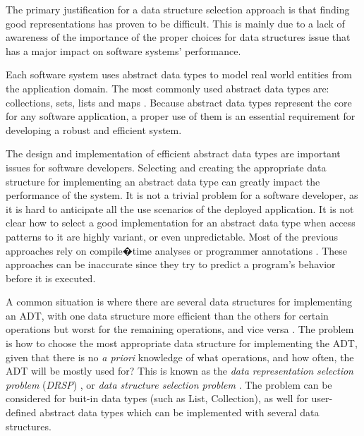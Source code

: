 
The primary justification for a data structure selection
approach is that finding good representations
has proven to be difficult. This is mainly due to a lack of awareness of the importance
of the proper choices for data structures issue that has a major impact on software systems' performance.

Each software system uses abstract data types \cite{adt} to model real world entities from the application domain. The most commonly used abstract data types are: collections, sets, lists and maps \cite{Cormen09Introduction}. Because abstract data types represent the core for any software application, a proper use of them is an essential requirement for developing a robust and efficient system. 

The design and implementation of efficient abstract data types are important issues for software developers. Selecting and creating the appropriate data structure for implementing an abstract data type can greatly impact the performance of the system. It is not a trivial problem for a software developer, as it is hard to anticipate all the use scenarios of the deployed application. It is not clear how to select a good implementation
for an abstract data type when access patterns to it are
highly variant, or even unpredictable. Most of the previous approaches rely on compile�time analyses or programmer annotations \cite{chuang}. These
approaches can be inaccurate since they try to predict
a program's behavior before it is executed. 

A common situation is where there are several data structures for implementing an ADT,
with one data structure more efficient than the others for
certain operations but worst for the remaining operations,
and vice versa \cite{chuang}. The problem is how to choose the most appropriate data structure for implementing the ADT,
given that there is no \emph{a priori} knowledge of what operations,
and how often, the ADT will be mostly used for?
This is known as the \emph{data representation selection problem} (\emph{DRSP}) \cite{sch}, or \emph{data structure selection problem} \cite{31}.
The problem can be considered for buit-in data types (such as List, Collection), as well for user-defined abstract data types which can be implemented with several data structures.  

